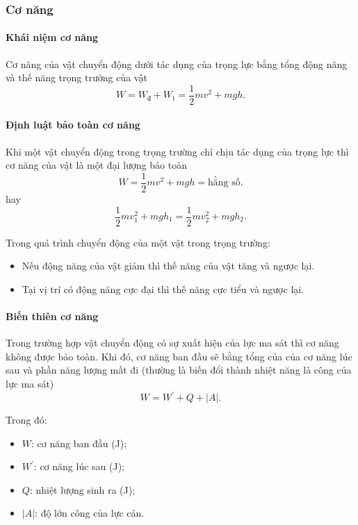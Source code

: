 \begin{tomtat}
\subsubsection{Cơ năng}
\paragraph{Khái niệm cơ năng}
\begin{dn}
	Cơ năng của vật chuyển động dưới tác dụng của trọng lực bằng tổng động năng và thế năng trọng trường của vật
	$$W=W_{\text{đ}}+W_{\text{t}}=\dfrac{1}{2}mv^2+mgh.$$
\end{dn}
\paragraph{Định luật bảo toàn cơ năng}
\begin{dl}
	Khi một vật chuyển động trong trọng trường chỉ chịu tác dụng của trọng lực thì cơ năng của vật là một đại lượng bảo toàn
	$$W=\dfrac{1}{2}mv^2+mgh=\text{hằng số}.$$
	hay
	$$\dfrac{1}{2}mv^2_1+mgh_1=\dfrac{1}{2}mv^2_2+mgh_2.$$
\end{dl}
Trong quá trình chuyển động của một vật trong trọng trường:
\begin{itemize}
	\item Nếu động năng của vật giảm thì thế năng của vật tăng và ngược lại.
	\item Tại vị trí có động năng cực đại thì thế năng cực tiểu và ngược lại.
\end{itemize}
\paragraph{Biến thiên cơ năng}
\begin{boxdl}
	Trong trường hợp vật chuyển động có sự xuất hiện của lực ma sát thì cơ năng không được bảo toàn. Khi đó, cơ năng ban đầu sẽ bằng tổng của của cơ năng lúc sau và phần năng lượng mất đi (thường là biến đổi thành nhiệt năng là công của lực ma sát)
	$$W=W^\prime+Q+\left|A\right|.$$
\end{boxdl}
Trong đó: 
\begin{itemize}
	\item $W$: cơ năng ban đầu (\si{\joule});
	\item $W^\prime$: cơ năng lúc sau (\si{\joule});
	\item $Q$: nhiệt lượng sinh ra (\si{\joule});
	\item $\left|A\right|$: độ lớn công của lực cản.
\end{itemize}
\end{tomtat}